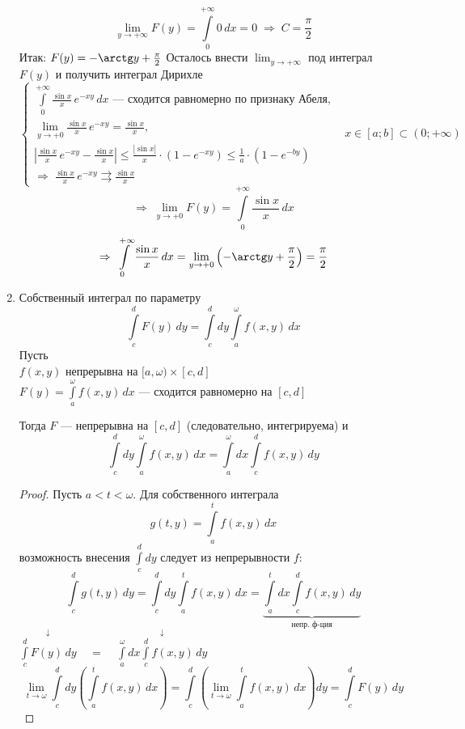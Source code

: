 \begin{properties}
\begin{enumerate}
\begin{example}
            \[ \lim_{y \to +\infty} F(y) = \int\limits_0^{+\infty} 0\,dx = 0 \;\Rightarrow\; C = \frac{\pi}2 \]
            Итак: $F(y) = -\arctg y + \frac{\pi}2$
            Осталось внести $\lim_{y \to +\infty}$ под интеграл $F(y)$ и получить интеграл Дирихле
            \[ \left\{\begin{array}{l} 
            \int\limits_0^{+\infty} \frac{\sin x}x\,e^{-xy}\,dx \text{ --- сходится равномерно по признаку Абеля}, \\
            \lim_{y \to +0} \frac{\sin x}x\,e^{-xy} = \frac{\sin x}x, \\
            \left| \frac{\sin x}x\,e^{-xy} - \frac{\sin x}x \right| \le \frac{|\sin x|}x \cdot \left( 1 - e^{-xy} \right) \le 
            \frac1a \cdot \left( 1 - e^{-by} \right) \\
            \Rightarrow\; \frac{\sin x}x\,e^{-xy} \rightrightarrows \frac{\sin x}x
            \end{array}\right. \ \ \ x \in [a; b] \subset (0; +\infty) \]
            \[ \Rightarrow\; \lim_{y \to +0} F(y) = \int\limits_0^{+\infty} \frac{\sin x}x\,dx \]
            \[ \Rightarrow\; \int\limits_0^{+\infty} \frac{\sin x}x\,dx = 
            \lim_{y \to +0} \left( -\arctg y + \frac{\pi}2 \right) = \frac{\pi}2 \]
        \end{example}
        
        \item Собственный интеграл по параметру
        \[ \int\limits_c^d F(y)\,dy = \int\limits_c^d dy \int\limits_a^{\omega} f(x, y)\,dx \]
        Пусть \\
        \phantom{Пусть} $f(x, y)$ непрерывна на $[a, \omega) \times [c, d]$ \\
        \phantom{Пусть} $F(y) = \int\limits_a^{\omega} f(x, y)\,dx$ --- сходится равномерно на $[c, d]$
        
        Тогда $F$ --- непрерывна на $[c, d]$ (следовательно, интегрируема) и 
        \[ \int\limits_c^d dy \int\limits_a^{\omega} f(x, y)\,dx = \int\limits_a^{\omega} dx \int\limits_c^d f(x, y)\,dy \]
        \begin{proof}
            Пусть $a < t < \omega$. Для собственного интеграла 
            \[ g(t, y) = \int\limits_a^t f(x, y)\,dx \]
            возможность внесения $\int\limits_c^d dy$ следует из непрерывности $f$:
            \[ \int\limits_c^d g(t, y)\,dy = \int\limits_c^d dy \int\limits_a^t f(x, y)\,dx = 
            \underset{\text{непр. ф-ция}}{\underbrace{\int\limits_a^t dx \int\limits_c^d f(x, y)\,dy}} \]
            \phantom{$\int\limits_c^d g(t, y)\,dy =\ \ \ \ \ $} $\overset{\downarrow}{\int\limits_c^d F(y)\,dy} \ \ \ \ \ = \ \ \ \ \ 
            \overset{\downarrow}{\int\limits_a^{\omega} dx \int\limits_c^d f(x, y)\,dy}$
            \[ \lim_{t \to \omega}\int\limits_c^d  dy \left( \int\limits_a^t f(x, y)\,dx \right) = 
            \int\limits_c^d \left( \lim_{t \to \omega} \int\limits_a^t f(x, y)\,dx \right) dy = \int\limits_c^d F(y)\,dy \]
        \end{proof}
        

\end{enumerate}
\end{properties}

